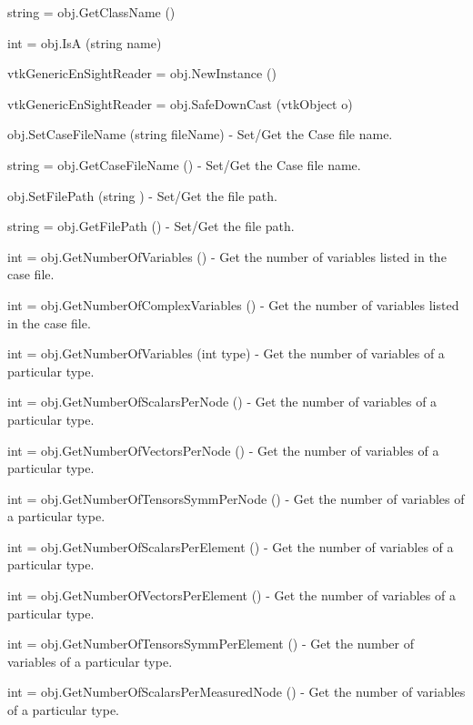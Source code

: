 \begin{DoxyItemize}
\item {\ttfamily string = obj.\-Get\-Class\-Name ()}  
\item {\ttfamily int = obj.\-Is\-A (string name)}  
\item {\ttfamily vtk\-Generic\-En\-Sight\-Reader = obj.\-New\-Instance ()}  
\item {\ttfamily vtk\-Generic\-En\-Sight\-Reader = obj.\-Safe\-Down\-Cast (vtk\-Object o)}  
\item {\ttfamily obj.\-Set\-Case\-File\-Name (string file\-Name)} -\/ Set/\-Get the Case file name.  
\item {\ttfamily string = obj.\-Get\-Case\-File\-Name ()} -\/ Set/\-Get the Case file name.  
\item {\ttfamily obj.\-Set\-File\-Path (string )} -\/ Set/\-Get the file path.  
\item {\ttfamily string = obj.\-Get\-File\-Path ()} -\/ Set/\-Get the file path.  
\item {\ttfamily int = obj.\-Get\-Number\-Of\-Variables ()} -\/ Get the number of variables listed in the case file.  
\item {\ttfamily int = obj.\-Get\-Number\-Of\-Complex\-Variables ()} -\/ Get the number of variables listed in the case file.  
\item {\ttfamily int = obj.\-Get\-Number\-Of\-Variables (int type)} -\/ Get the number of variables of a particular type.  
\item {\ttfamily int = obj.\-Get\-Number\-Of\-Scalars\-Per\-Node ()} -\/ Get the number of variables of a particular type.  
\item {\ttfamily int = obj.\-Get\-Number\-Of\-Vectors\-Per\-Node ()} -\/ Get the number of variables of a particular type.  
\item {\ttfamily int = obj.\-Get\-Number\-Of\-Tensors\-Symm\-Per\-Node ()} -\/ Get the number of variables of a particular type.  
\item {\ttfamily int = obj.\-Get\-Number\-Of\-Scalars\-Per\-Element ()} -\/ Get the number of variables of a particular type.  
\item {\ttfamily int = obj.\-Get\-Number\-Of\-Vectors\-Per\-Element ()} -\/ Get the number of variables of a particular type.  
\item {\ttfamily int = obj.\-Get\-Number\-Of\-Tensors\-Symm\-Per\-Element ()} -\/ Get the number of variables of a particular type.  
\item {\ttfamily int = obj.\-Get\-Number\-Of\-Scalars\-Per\-Measured\-Node ()} -\/ Get the number of variables of a particular type.  

\end{DoxyItemize}
